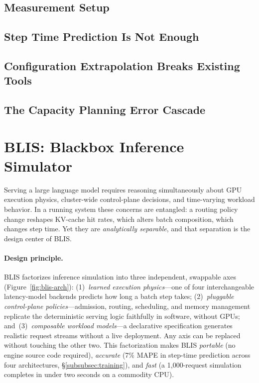 \documentclass[11pt]{article}
\theoremstyle{plain} %
\theoremstyle{definition} %
\theoremstyle{remark} %
\numberwithin{equation}{section}
\begin{document}
\subsection{Measurement Setup}
\label{subsec:hard-setup}
\subsection{Step Time Prediction Is Not Enough}
\label{subsec:hard-steptime}
\subsection{Configuration Extrapolation Breaks Existing Tools}
\label{subsec:hard-extrap}
\subsection{The Capacity Planning Error Cascade}
\label{subsec:hard-cascade}

\section{BLIS: Blackbox Inference Simulator}
\label{sec:design}

Serving a large language model requires reasoning simultaneously about GPU execution
physics, cluster-wide control-plane decisions, and time-varying workload behavior.
In a running system these concerns are entangled: a routing policy change reshapes
KV-cache hit rates, which alters batch composition, which changes step time.
Yet they are \emph{analytically separable}, and that separation is the design center
of BLIS.

\paragraph{Design principle.}
BLIS factorizes inference simulation into three independent, swappable axes
(Figure~\ref{fig:blis-arch}):
(1)~\emph{learned execution physics}---one of four interchangeable latency-model
backends predicts how long a batch step takes;
(2)~\emph{pluggable control-plane policies}---admission, routing, scheduling, and
memory management replicate the deterministic serving logic faithfully in software,
without GPUs;
and~(3)~\emph{composable workload models}---a declarative specification generates
realistic request streams without a live deployment.
Any axis can be replaced without touching the other two.
This factorization makes BLIS \emph{portable} (no engine source code required),
\emph{accurate} (7\% MAPE in step-time prediction across four architectures,
\S\ref{subsubsec:training}), and \emph{fast} (a 1{,}000-request simulation
completes in under two seconds on a commodity CPU).
\end{document}
